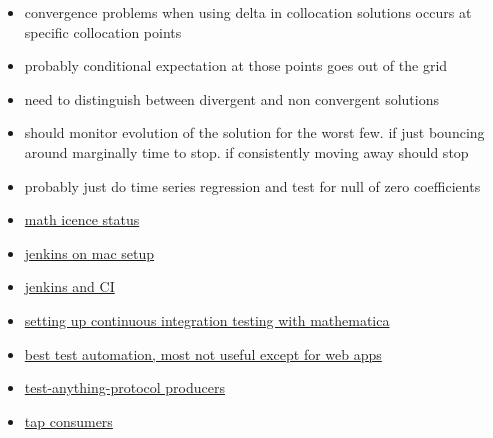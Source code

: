 \documentclass[hyperref]{labbook}
\begin{document}

\begin{itemize}
\item convergence problems when using delta in collocation solutions occurs at specific collocation points
\item probably conditional expectation at those points goes out of the grid
\item need to distinguish between divergent and non convergent solutions
\item should monitor evolution of the solution for the worst few.  if just bouncing around marginally time to stop.  if consistently moving away should stop
\item probably just do time series regression and test for null of zero coefficients
\end{itemize}



\begin{itemize}
\item \href{ssh ublm1 /var/appl/matlmd/scripts/mathlm status}{math icence status}
\end{itemize}


\begin{itemize}
\item \href{https://www.blazemeter.com/blog/how-start-working-github-plugin-jenkins}{jenkins on mac setup}
\item \href{https://dev.to/iriskatastic/start-continuous-integration-with-jenkins-pipeline-4edb}{jenkins and CI}
\end{itemize}

\begin{itemize}
\item \href{https://mathematica.stackexchange.com/questions/163912/automating-testing-of-mathematica-code}{setting up continuous integration testing with mathematica}
\item \href{https://medium.com/@briananderson2209/best-automation-testing-tools-for-2018-top-10-reviews-8a4a19f664d2}{best test automation, most not useful except for web apps}
\item \href{https://testanything.org/producers.html}{test-anything-protocol producers}
\item \href{https://testanything.org/consumers.html}{tap consumers}
\end{itemize}
\end{document}
